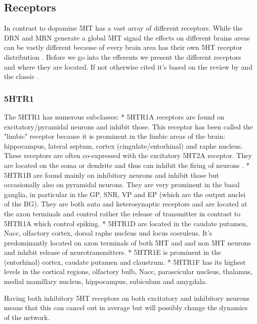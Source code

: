 \documentclass[12pt,a4paper]{article}
\begin{document}
\subsection{Receptors}

In contrast to dopamine 5HT has a vast array of different receptors. While the DRN and MRN generate a global 5HT signal the effects on different brains areas can be vastly different because of every brain area has their own 5HT receptor distribution \citep{Palacios1990} \citep{Carhart-Harris2017}. Before we go into the efferents we present the different receptors and where they are located. If not otherwise cited it's based on the review by \citep{Mengod2010} and the classic \citep{Palacios1990}.

\subsubsection{5HTR1}

The 5HTR1 has numerous subclasses:
  * 5HTR1A receptors are found on excitatory/pyramidal neurons and inhibit those. This receptor has been called the "limbic" receptor because it is prominent in the limbic areas of the brain: hippocampus, lateral septum, cortex (cingulate/entorhinal) and raphe nucleus. These receptors are often co-expressed with the excitatory 5HT2A receptor. They are located on the soma or dendrite and thus can inhibit the firing of neurons \citep{Riad2000}.
  * 5HTR1B are found mainly on inhibitory neurons and inhibit those but occasionally also on pyramidal neurons. They are very prominent in the basal ganglia, in particular in the GP, SNR, VP and EP (which are the output nuclei of the BG). They are both auto and heterosynaptic receptors and are located at the axon terminals \citep{Riad2000} and control rather the release of transmitter in contrast to 5HTR1A which control spiking.
  * 5HTR1D are located in the caudate putamen, Nacc, olfactory cortex, dorsal raphe nucleus und locus coeruleus. It's predominantly located on axon terminals of both 5HT and and non 5HT neurons and inhibit release of neurotransmitters.
  * 5HTR1E is prominent in the (entorhinal) cortex, caudate putamen and claustrum.
  * 5HTR1F has its highest levels in the cortical regions, olfactory bulb, Nacc, parascicular nucleus, thalamus, medial mamillary nucleus, hippocampus, subiculum and amygdala.

Having both inhibitory 5HT receptors on both excitatory and inhibitory neurons means that this can cancel out in average but will possibly change the dynamics of the network.
\end{document}
